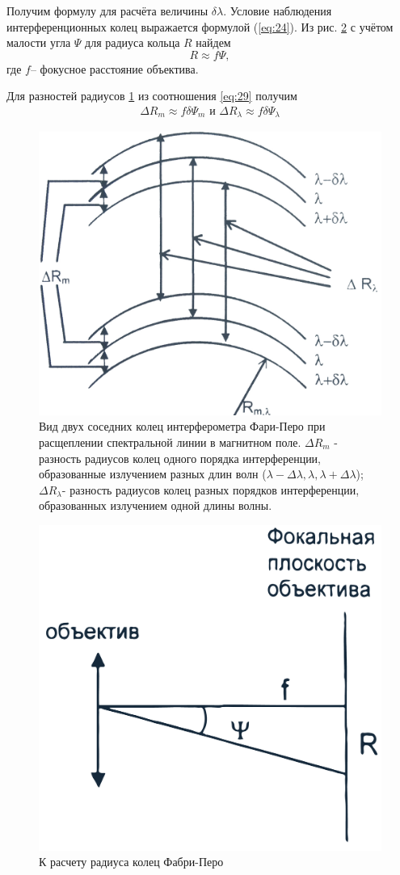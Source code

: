 Получим формулу для расчёта величины $\delta \lambda$. Условие наблюдения интерференционных колец выражается формулой (\ref{eq:24}). Из рис. \ref{fig:10}  с учётом малости угла $\Psi$ для радиуса кольца $R$ найдем
\begin{equation}
	\label{eq:29}
	R\approx f\Psi,
\end{equation}
где $f$-- фокусное расстояние объектива.


Для разностей радиусов \ref{fig:9} из соотношения \ref{eq:29} получим 
\begin{gather}
	\label{eq:30}
	\Delta R_m \approx f \delta \Psi_m \text{ и } \Delta R_{\lambda} \approx f \delta \Psi_{\lambda} 
\end{gather}
\begin{figure}[H]
	\centering
	\includegraphics[width=0.7\linewidth]{fig/fig9.jpg}
	\caption{Вид двух соседних колец интерферометра Фари-Перо при расщеплении спектральной линии в магнитном поле. $\Delta R_m$ 
	- разность радиусов колец одного порядка интерференции, образованные излучением разных длин волн ($\lambda- \Delta \lambda, \lambda, \lambda+ \Delta \lambda$); $\Delta R_{\lambda}$- разность радиусов колец разных порядков интерференции, образованных излучением одной длины волны.}
	\label{fig:9}
\end{figure}

\begin{figure}[tb]
	\centering
	\includegraphics[width=0.5\linewidth]{fig/fig10}
	\caption{К расчету радиуса колец Фабри-Перо}
	\label{fig:10}
\end{figure}

